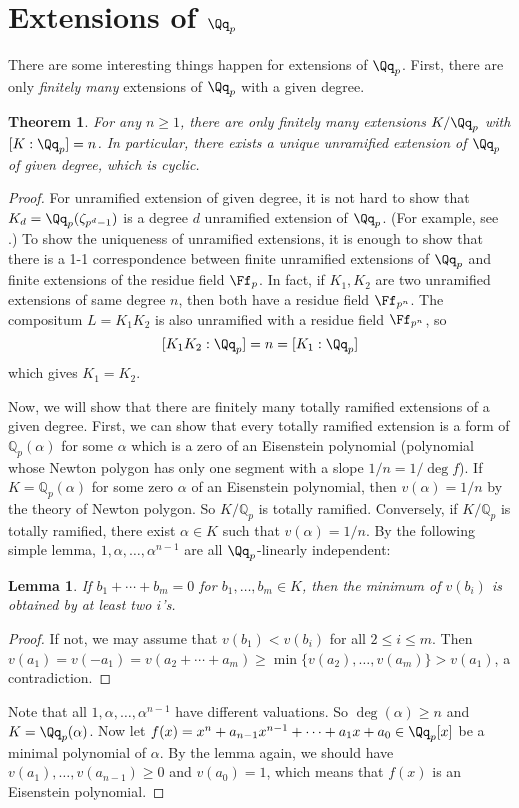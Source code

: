 \documentclass{article}
\newtheorem{theorem}{Theorem}
\newtheorem{lemma}{Lemma}
\begin{document}
\section{Extensions of $\Qq_{p}$}
There are some interesting things happen for extensions of $\Qq_p$. 
First, there are only \emph{finitely many} extensions of $\Qq_p$ with a given degree. 
\begin{theorem}
For any $n\geq 1$, there are only finitely many extensions $K/\Qq_{p}$ with $[K:\Qq_{p}] = n$. In particular, there exists a unique unramified extension of $\Qq_{p}$ of given degree, which is cyclic. 
\end{theorem}
\begin{proof}
For unramified extension of given degree, it is not hard to show that $K_d = \Qq_{p}(\zeta_{p^d-1})$ is a degree $d$ unramified extension of $\Qq_{p}$. (For example, see \cite{neu}.) 
To show the uniqueness of unramified extensions, it is enough to show that there is a 1-1 correspondence between finite unramified extensions of $\Qq_{p}$ and finite extensions of the residue field $\Ff_{p}$. In fact, if $K_1, K_2$ are two unramified extensions of same degree $n$, then both have a residue field $\Ff_{p^n}$. 
The compositum $L = K_1 K_2$ is also unramified with a residue field $\Ff_{p^n}$, so 
$$
[K_1 K_2:\Qq_p] = n = [K_1 : \Qq_p]
$$
which gives $K_1 = K_2$. 

Now, we will show that there are finitely many totally ramified extensions of a given degree. 
First, we can show that every totally ramified extension is a form of $\mathbb{Q}_{p}(\alpha)$ for some $\alpha$ which is a zero of an Eisenstein polynomial (polynomial whose Newton polygon has only one segment with a slope $1/n = 1/\deg f$). 
If $K = \mathbb{Q}_{p}(\alpha)$ for some zero $\alpha$ of an Eisenstein polynomial, then $v(\alpha) = 1/n$ by the theory of Newton polygon. So $K/\mathbb{Q}_{p}$ is totally ramified. 
Conversely, if $K/\mathbb{Q}_p$ is totally ramified, there exist $\alpha \in K$ such that $v(\alpha) = 1/n$. 
By the following simple lemma, $1, \alpha, \dots, \alpha^{n-1}$ are all $\Qq_p$-linearly independent:
\begin{lemma}
If $b_{1} +\cdots + b_m = 0$ for $b_1, \dots, b_m \in K$, then the minimum of $v(b_i)$ is obtained by at least two $i$'s. 
\end{lemma}
\begin{proof}
If not, we may assume that $v(b_1) < v(b_i)$ for all $2\leq i\leq m$. 
Then $v(a_1) = v(-a_1) = v(a_2 + \cdots + a_m) \geq \min\{v(a_2), \dots, v(a_m)\} > v(a_1)$, a contradiction. 
\end{proof}
Note that all $1, \alpha, \dots, \alpha^{n-1}$ have different valuations. 
So $\deg(\alpha) \geq n$ and $K = \Qq_{p}(\alpha)$. 
Now let $f(x) = x^{n} + a_{n-1}x^{n-1} + \cdots + a_{1}x + a_{0} \in \Qq_{p}[x]$ be a minimal polynomial of $\alpha$. 
By the lemma again, we should have $v(a_1), \dots, v(a_{n-1})\geq 0$ and $v(a_{0}) = 1$, which means that $f(x)$ is an Eisenstein polynomial. 


\end{proof}
\end{document}
